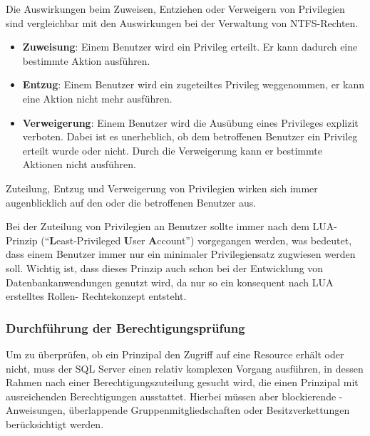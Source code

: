           Die Auswirkungen beim Zuweisen, Entziehen oder Verweigern von
          Privilegien sind vergleichbar mit den Auswirkungen bei der
          Verwaltung von NTFS-Rechten.
          \begin{itemize}
            \item \textbf{Zuweisung}: Einem Benutzer wird ein Privileg erteilt.
            Er kann dadurch eine bestimmte Aktion ausführen.
            \item \textbf{Entzug}: Einem Benutzer wird ein zugeteiltes Privileg
            weggenommen, er kann eine Aktion nicht mehr ausführen.
            \item \textbf{Verweigerung}: Einem Benutzer wird die Ausübung eines
            Privileges explizit verboten. Dabei ist es unerheblich, ob dem
            betroffenen Benutzer ein Privileg erteilt wurde oder nicht. Durch
            die Verweigerung kann er bestimmte Aktionen nicht ausführen.
          \end{itemize}
          \begin{merke}
            Zuteilung, Entzug und Verweigerung von Privilegien wirken sich immer
            augenblicklich auf den oder die betroffenen Benutzer aus.
          \end{merke}
          Bei der Zuteilung von Privilegien an Benutzer sollte immer nach dem
          LUA-Prinzip (\enquote{\textbf{L}east-Privileged \textbf{U}ser
          \textbf{A}ccount}) vorgegangen werden, was bedeutet, dass einem
          Benutzer immer nur ein minimaler Privilegiensatz zugwiesen werden
          soll. Wichtig ist, dass dieses Prinzip auch schon bei der Entwicklung
          von Datenbankanwendungen genutzt wird, da nur so ein konsequent nach
          LUA erstelltes Rollen- Rechtekonzept entsteht.
        \subsubsection{Durchführung der Berechtigungsprüfung}
          Um zu überprüfen, ob ein Prinzipal den Zugriff auf eine Resource
          erhält oder nicht, muss der SQL Server einen relativ komplexen Vorgang
          ausführen, in dessen Rahmen nach einer Berechtigungszuteilung gesucht
          wird, die einen Prinzipal mit ausreichenden Berechtigungen ausstattet.
          Hierbei müssen aber blockierende \DENY-Anweisungen, überlappende
          Gruppenmitgliedschaften oder Besitzverkettungen berücksichtigt werden.
          
